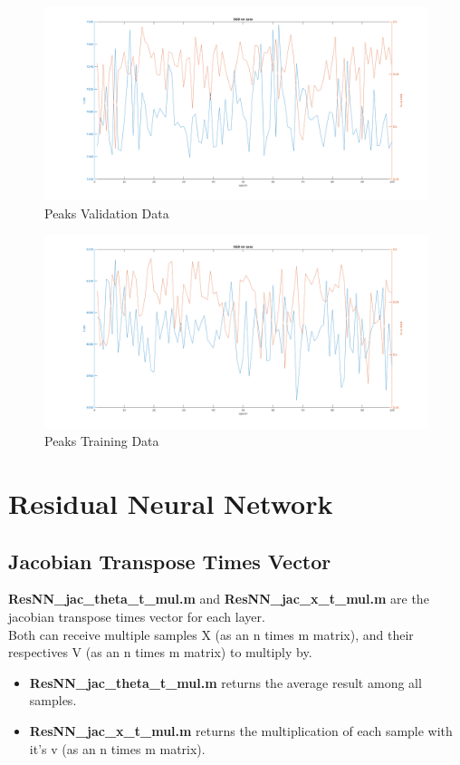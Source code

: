 \documentclass{article}
\numberwithin{equation}{section}
\begin{document}
\begin{figure}[h!]
  \caption{Peaks Validation Data}
  \includegraphics[width=\textwidth]{loss_sgd_val.png}
\end{figure}

\begin{figure}[h!]
  \caption{Peaks Training Data}
  \includegraphics[width=\textwidth]{loss_sgd_train.png}
\end{figure}

\newpage

\section{Residual Neural Network}
\subsection{Jacobian Transpose Times Vector}
\textbf{ResNN{\_}jac{\_}theta{\_}t{\_}mul.m} and \textbf{ResNN{\_}jac{\_}x{\_}t{\_}mul.m} are the jacobian transpose times vector for each layer.\\

Both can receive multiple samples X (as an n times m matrix), and their respectives V (as an n times m matrix) to multiply by.
\begin{itemize}
\item 
\textbf{ResNN{\_}jac{\_}theta{\_}t{\_}mul.m} returns the average result among all samples.
\item
\textbf{ResNN{\_}jac{\_}x{\_}t{\_}mul.m} returns the multiplication of each sample with it's v (as an n times m matrix).
\end{itemize}
\end{document}
